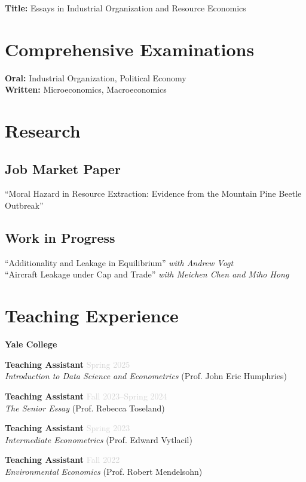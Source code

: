 \documentclass[11pt,letterpaper]{article}
\newcommand{\jobtitle}[1]{\textbf{\color{mediumgray}#1}}
\newcommand{\institution}[1]{\textit{#1}}
\newcommand{\daterange}[1]{\textcolor{lightgray}{#1}}
\begin{document}
\textbf{Title:} Essays in Industrial Organization and Resource Economics

\section*{Comprehensive Examinations}
\textbf{Oral:} Industrial Organization, Political Economy \\
\textbf{Written:} Microeconomics, Macroeconomics  

\section*{Research}

\subsection*{Job Market Paper}
``Moral Hazard in Resource Extraction: Evidence from the Mountain Pine Beetle Outbreak''

\subsection*{Work in Progress}
``Additionality and Leakage in Equilibrium'' \textit{with Andrew Vogt} \\
``Aircraft Leakage under Cap and Trade'' \textit{with Meichen Chen and Miho Hong}


\section*{Teaching Experience}

\textbf{Yale College}

\jobtitle{Teaching Assistant} \hfill \daterange{Spring 2025} \\
\institution{Introduction to Data Science and Econometrics} (Prof. John Eric Humphries)

\newpage

\jobtitle{Teaching Assistant} \hfill \daterange{Fall 2023--Spring 2024} \\
\institution{The Senior Essay} (Prof. Rebecca Toseland)

\jobtitle{Teaching Assistant} \hfill \daterange{Spring 2023} \\
\institution{Intermediate Econometrics} (Prof. Edward Vytlacil)

\jobtitle{Teaching Assistant} \hfill \daterange{Fall 2022} \\
\institution{Environmental Economics} (Prof. Robert Mendelsohn)
\end{document}

